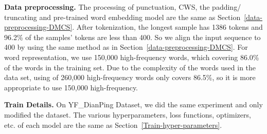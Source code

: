 \textbf{Data preprocessing.}
The processing of punctuation, CWS, the padding/ truncating and pre-trained word embedding model are the same as Section~\ref{data-preprocessing-DMCS}.  After tokenization, the longest sample has 1386 tokens and 96.2\% of the samples' tokens are less than 400. So we align the input sequence to 400 by using the same method as in Section~\ref{data-preprocessing-DMCS}. For word representation, we use 150,000 high-frequency words, which covering 86.0\% of the words in the training set. Due to the complexity of the words used in the data set, using of 260,000 high-frequency words only covers 86.5\%, so it is more appropriate to use 150,000 high-frequency.

\textbf{Train Details.}
On YF\_DianPing Dataset, we did the same experiment and only modified the dataset. The various hyperparameters, loss functions, optimizers, etc. of each model are the same as Section~\ref{Train-hyper-parameters}.

